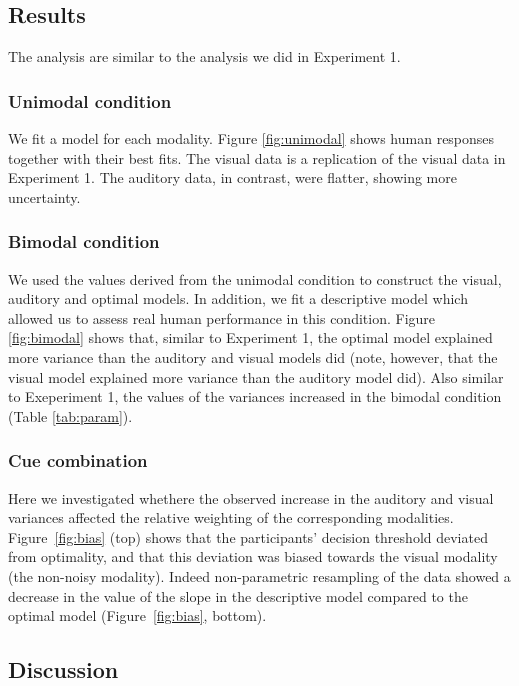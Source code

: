 \documentclass[english,,man,floatsintext]{apa6}
\theoremstyle{definition}
\theoremstyle{definition}
\theoremstyle{definition}
\theoremstyle{remark}
\begin{document}
\subsection{Results}\label{results}

The analysis are similar to the analysis we did in Experiment 1.

\subsubsection{Unimodal condition}\label{unimodal-condition}

We fit a model for each modality. Figure \ref{fig:unimodal} shows human
responses together with their best fits. The visual data is a
replication of the visual data in Experiment 1. The auditory data, in
contrast, were flatter, showing more uncertainty.

\subsubsection{Bimodal condition}\label{bimodal-condition-2}

We used the values derived from the unimodal condition to construct the
visual, auditory and optimal models. In addition, we fit a descriptive
model which allowed us to assess real human performance in this
condition. Figure \ref{fig:bimodal} shows that, similar to Experiment 1,
the optimal model explained more variance than the auditory and visual
models did (note, however, that the visual model explained more variance
than the auditory model did). Also similar to Exeperiment 1, the values
of the variances increased in the bimodal condition (Table
\ref{tab:param}).

\subsubsection{Cue combination}\label{cue-combination-1}

Here we investigated whethere the observed increase in the auditory and
visual variances affected the relative weighting of the corresponding
modalities. Figure~\ref{fig:bias} (top) shows that the participants'
decision threshold deviated from optimality, and that this deviation was
biased towards the visual modality (the non-noisy modality). Indeed
non-parametric resampling of the data showed a decrease in the value of
the slope in the descriptive model compared to the optimal model
(Figure~\ref{fig:bias}, bottom).

\subsection{Discussion}\label{discussion-1}
\end{document}
